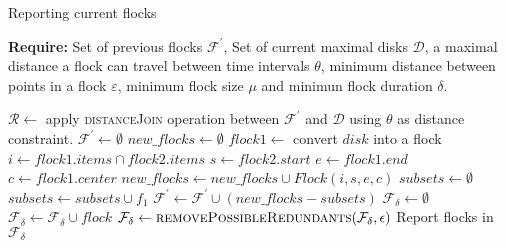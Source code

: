 \documentclass{article}
\begin{document}
    \begin{algorithm} \caption{Reporting current flocks}
        \textbf{Require:} Set of previous flocks $\mathcal F^\prime$, Set of current maximal disks $\mathcal D$, a maximal distance a flock can travel between time intervals $\theta$, minimum distance between points in a flock $\varepsilon$, minimum flock size $\mu$ and minimun flock duration $\delta$.
        \begin{algorithmic}[1]
            \State $\mathcal R \gets $ apply \textsc{distanceJoin} operation between $\mathcal F^\prime$ and $\mathcal D$ using $\theta$ as distance constraint. 
            \State $\mathcal F^\prime \gets \emptyset$
                \State $new\_flocks \gets \emptyset$
                \State $flock1 \gets$ convert $disk$ into a flock 
                    \State $i \gets flock1.items \cap flock2.items$
                    \State $s \gets flock2.start$
                    \State $e \gets flock1.end$
                    \State $c \gets flock1.center$
                        \State $new\_flocks \gets new\_flocks \cup Flock(i,s,e,c)$
                    \EndIf
                \EndFor
                \State $subsets \gets \emptyset$
                                \State $subsets \gets subsets \cup f_1$
                            \EndIf
                        \EndIf
                    \EndFor
                \EndFor
                \State $\mathcal F^\prime \gets \mathcal F^\prime \cup (new\_flocks - subsets)$
            \EndFor
            \State $\mathcal F_\delta \gets \emptyset$ 
                    \State $\mathcal F_\delta \gets \mathcal F_\delta \cup flock$
                \EndIf
            \EndFor
            \State $\mathcal F_\delta \gets \textsc{removePossibleRedundants}(\mathcal F_\delta, \epsilon)$
            \State Report flocks in $\mathcal F_\delta$ 
        \end{algorithmic}
    \end{algorithm}
    
\end{document}
